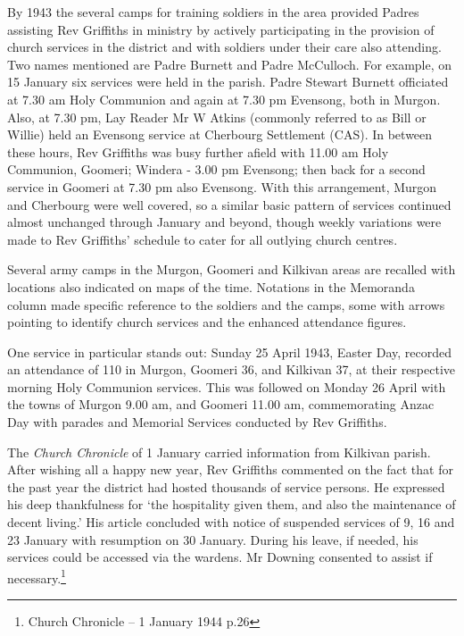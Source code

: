 By 1943 the several camps for training soldiers in the area provided Padres assisting Rev Griffiths in ministry by actively participating in the provision of church services in the district and with soldiers under their care also attending. Two names mentioned are Padre Burnett and Padre McCulloch. For example, on 15 January six services were held in the parish. Padre Stewart Burnett officiated at 7.30 am Holy Communion and again at 7.30 pm Evensong, both in Murgon. Also, at 7.30 pm, Lay Reader Mr W Atkins (commonly referred to as Bill or Willie) held an Evensong service at Cherbourg Settlement (CAS). In between these hours, Rev Griffiths was busy further afield with 11.00 am Holy Communion, Goomeri; Windera - 3.00 pm Evensong; then back for a second service in Goomeri at 7.30 pm also Evensong. With this arrangement, Murgon and Cherbourg were well covered, so a similar basic pattern of services continued almost unchanged through January and beyond, though weekly variations were made to Rev Griffiths' schedule to cater for all outlying church centres.



Several army camps in the Murgon, Goomeri and Kilkivan areas are recalled with locations also indicated on maps of the time. Notations in the Memoranda column made specific reference to the soldiers and the camps, some with arrows pointing to identify church services and the enhanced attendance figures.



One service in particular stands out: Sunday 25 April 1943, Easter Day, recorded an attendance of 110 in Murgon, Goomeri 36, and Kilkivan 37, at their respective morning Holy Communion services. This was followed on Monday 26 April with the towns of Murgon 9.00 am, and Goomeri 11.00 am, commemorating Anzac Day with parades and Memorial Services conducted by Rev Griffiths.



The \emph{Church Chronicle} of 1 January carried information from Kilkivan parish. After wishing all a happy new year, Rev Griffiths commented on the fact that for the past year the district had hosted thousands of service persons. He expressed his deep thankfulness for `the hospitality given them, and also the maintenance of decent living.' His article concluded with notice of suspended services of 9, 16 and 23 January with resumption on 30 January. During his leave, if needed, his services could be accessed via the wardens. Mr Downing consented to assist if necessary.\footnote{Church Chronicle -- 1 January 1944 p.26}


